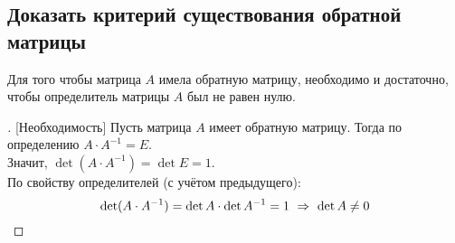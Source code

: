 \subsection{Доказать критерий существования обратной матрицы}
\begin{theorem*}
	Для того чтобы матрица $A$ имела обратную матрицу, необходимо и достаточно, чтобы определитель матрицы $A$ был не равен нулю.
\end{theorem*}
\begin{proof}[][Необходимость]
	Пусть матрица $A$ имеет обратную матрицу. Тогда по определению $A \cdot A^{-1} = E$.\\ Значит, $\det (A\cdot A^{-1}) = \det E=1$.\\
	По свойству определителей (с учётом предыдущего): \vspace{-\topsep}
	\[ \det (A\cdot A^{-1}) = \det A \cdot \det A^{-1} = 1\ \Rightarrow\ \det A \ne 0 \vspace{-\topsep}\] 
\end{proof} 
